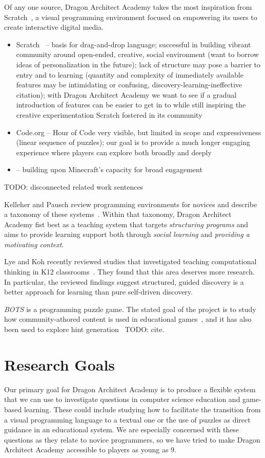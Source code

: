 \documentclass{sig-alternate}
\newcommand{\TODO}[1]{{\color{red} TODO: #1}}
\newcommand{\gametitle}{{\color{RoyalPurple} Dragon Architect Academy}}
\begin{document}
Of any one source, \gametitle{} takes the most inspiration from Scratch~\cite{maloney2010scratch}, a visual programming environment focused on empowering its users to create interactive digital media.
\begin{itemize}
\item Scratch~\cite{maloney2010scratch} -- basis for drag-and-drop language; successful in building vibrant community around open-ended, creative, social environment (want to borrow ideas of personalization in the future); lack of structure may pose a barrier to entry and to learning (quantity and complexity of immediately available features may be intimidating or confusing, discovery-learning-ineffective citation); with \gametitle{} we want to see if a gradual introduction of features can be easier to get in to while still inspiring the creative experimentation Scratch fostered in its community
\item Code.org -- Hour of Code very visible, but limited in scope and expressiveness (linear sequence of puzzles); our goal is to provide a much longer engaging experience where players can explore both broadly and deeply
\item \cite{zorn2013minecraft} -- building upon Minecraft's capacity for broad engagement
\end{itemize}

\TODO{disconnected related work sentences}

Kelleher and Pausch review programming environments for novices and describe a taxonomy of these systems~\cite{kelleher2005lowering}. Within that taxonomy, \gametitle{} fist best as a teaching system that targets \emph{structuring programs} and aims to provide learning support both through \emph{social learning} and \emph{providing a motivating context}.

Lye and Koh recently reviewed studies that investigated teaching computational thinking in K12 classrooms~\cite{lye2014review}.
They found that this area deserves more research.
In particular, the reviewed findings suggest structured, guided discovery is a better approach for learning than pure self-driven discovery.

\emph{BOTS} is a programming puzzle game. The stated goal of the project is to study how community-athored content is used in educational games~\cite{hickspart14}, and it has also been used to explore hint generation~\TODO{cite}.


\section{Research Goals}
\label{sec:goals}
Our primary goal for \gametitle{} is to produce a flexible system that we can use to investigate questions in computer science education and game-based learning. These could include studying how to facilitate the transition from a visual programming language to a textual one or the use of puzzles as direct guidance in an educational system. We are especially concerned with these questions as they relate to novice programmers, so we have tried to make \gametitle{} accessible to players as young as 9.
\end{document}
